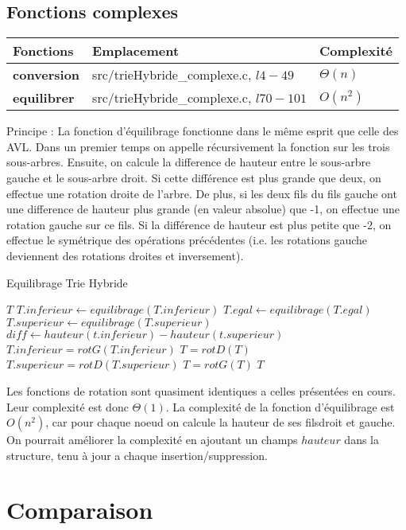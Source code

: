 \documentclass[11pt]{report} %
\begin{document}
\section{Fonctions complexes}

\begin{center}
  \begin{tabular}{|l|l|l|}
    \hline  \textbf{Fonctions} & \textbf{Emplacement} & \textbf{Complexité}\\  \hline
    \textbf{conversion} & src/trieHybride\_complexe.c, $l4-49$  & $\Theta(n)$ \\ \hline
    \textbf{equilibrer} & src/trieHybride\_complexe.c, $l70-101$  & $O(n^2)$ \\ \hline
  \end{tabular}
\end{center}

Principe : La fonction d'équilibrage fonctionne dans le même esprit que celle des AVL. Dans un premier temps on appelle récursivement la fonction sur les trois sous-arbres. Ensuite, on calcule la difference de hauteur entre le sous-arbre gauche et le sous-arbre droit. Si cette différence est plus grande que deux, on effectue une rotation droite de l'arbre. De plus, si les deux fils du fils gauche ont une difference de hauteur plus grande (en valeur absolue) que -1, on effectue une rotation gauche sur ce fils. Si la différence de hauteur est plus petite que -2, on effectue le symétrique des opérations précédentes (i.e. les rotations gauche deviennent des rotations droites et inversement).
\begin{algorithm}
  \caption{Equilibrage Trie Hybride}
  \begin{algorithmic}[1]
     $T$
    \EndIf
    \State $T.inferieur \gets equilibrage(T.inferieur)$
    \State $T.egal \gets equilibrage(T.egal)$
    \State $T.superieur \gets equilibrage(T.superieur)$
    \State $diff \gets hauteur(t.inferieur)-hauteur(t.superieur)$
    \State $T.inferieur=rotG(T.inferieur)$
    \EndIf  
    \State $T=rotD(T)$
    \State $T.superieur=rotD(T.superieur)$
    \EndIf  
    \State $T=rotG(T)$
    \EndIf
     $T$
    \EndFunction
  \end{algorithmic}
\end{algorithm}

Les fonctions de rotation sont quasiment identiques a celles présentées en cours. Leur complexité est donc $\Theta(1)$. La complexité de la fonction d'équilibrage est $O(n^2)$, car pour chaque noeud on calcule la hauteur de ses filsdroit et gauche. On pourrait améliorer la complexité en ajoutant un champs $hauteur$ dans la structure, tenu à jour a chaque insertion/suppression.

\chapter{Comparaison}
\end{document}
